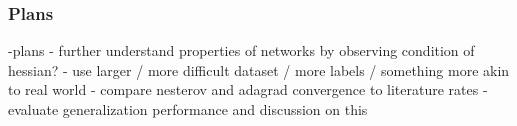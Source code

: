 \subsubsection*{Plans}
-plans
    - further understand properties of networks by observing condition of hessian?
    - use larger / more difficult dataset / more labels / something more akin to real world
    - compare nesterov and adagrad convergence to literature rates
    - evaluate generalization performance and discussion on this

